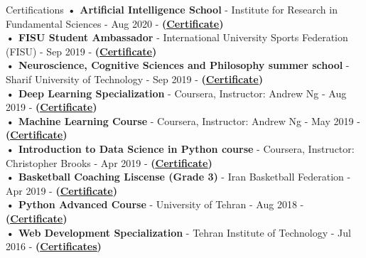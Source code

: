 \documentclass{resume} %
\begin{document}
\begin{rSection}{Certifications}
\textbf{• Artificial Intelligence School} - Institute for Research in Fundamental Sciences - Aug 2020 -  \textbf{(\underline{\href{https://www.dropbox.com/s/tgzmoozg6dpxkh5/IPM.jpeg?dl=0}{Certificate}})}\\
\textbf{• FISU Student Ambassador} -  International University Sports Federation (FISU) - Sep 2019 -  \textbf{(\underline{\href{https://www.dropbox.com/s/mzyacyxfu9lyaj7/FISU.jpeg?dl=0}{Certificate}})} \\
\textbf{• Neuroscience, Cognitive Sciences and Philosophy summer school} -  Sharif University of Technology - Sep 2019 -  \textbf{(\underline{\href{https://www.dropbox.com/s/picl1yc8ryl7hu9/image.jpg?dl=0}{Certificate}})} \\
\textbf{• Deep Learning Specialization} -  Coursera, Instructor: Andrew Ng - Aug 2019 - \textbf{(\underline{\href{https://coursera.org/share/0c714665c83509b5b92873ec79f3e688}{Certificate}})} \\
\textbf{• Machine Learning Course} -  Coursera, Instructor: Andrew Ng - May 2019 - \textbf{(\underline{\href{https://www.coursera.org/account/accomplishments/certificate/2CCX8VKNTVT4}{Certificate}})} \\
\textbf{• Introduction to Data Science in Python course} -  Coursera, Instructor: Christopher Brooks - Apr 2019 -  \textbf{(\underline{\href{https://coursera.org/share/1fb331ae06109c2acd8c97bb1c5ecb7d}{Certificate}})} \\
\textbf{• Basketball Coaching Liscense (Grade 3)} -  Iran Basketball Federation - Apr 2019 - \textbf{(\underline{\href{https://www.dropbox.com/s/1g2eu68bj7pxe88/IMG_4154.JPG?dl=0}{Certificate}})} \\
\textbf{• Python Advanced Course} -  University of Tehran - Aug 2018 - \textbf{(\underline{\href{https://maktabkhooneh.org/media/students/certificates/15436639404469314.pdf}{Certificate}})} \\
\textbf{• Web Development Specialization} -  Tehran Institute of Technology - Jul 2016 -  \textbf{(\underline{\href{https://www.dropbox.com/s/yfq18zu721nhoui/certs.jpg?dl=0}{Certificates}})}



\end{rSection}
\end{document}
